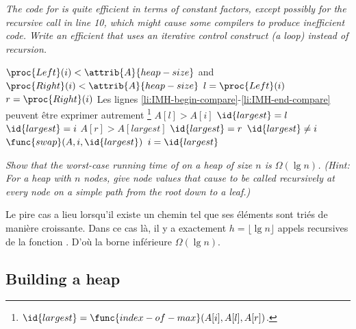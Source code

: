 \begin{description}
\begin{ex}
    \end{ex}
   \textit{The code for  is quite efficient in terms of constant factors, except
possibly for the recursive call in line 10, which might cause some compilers to
produce inefficient code. Write an efficient  that uses an iterative
control construct (a loop) instead of recursion.}
    \begin{ex}
      \begin{codebox}
        \li \While $\proc{Left}(i) < \attrib{A}{heap-size}$ and $\proc{Right}(i) < \attrib{A}{heap-size}$ \Do
        \li $l = \proc{Left}(i)$
        \li $r = \proc{Right}(i)$
        \li \Comment Les lignes \ref{li:IMH-begin-compare}-\ref{li:IMH-end-compare} peuvent \^etre exprimer autrement
      \footnote{$\id{largest} = \func{index-of-max}(A[i], A[l], A[r])$.}
        \li \If  $A[l] > A[i]$ \Do           \label{li:IMH-begin-compare} 
        \li $\id{largest} = l$        
        \li \Else $\id{largest} = i$ \End
        \li \If  $A[r] > A[largest]$ \Do
        \li $\id{largest} = r$  \End         \label{li:IMH-end-compare}
        \li \If $\id{largest} \ne i$ \Do
        \li $\func{swap}(A,i,\id{largest})$ 
        \li $i = \id{largest}$
        \li \Else \Return \End
        \End 
      \end{codebox}
    \end{ex}
   \textit{Show that the worst-case running time of  on a heap of size $n$
is $\Omega(\lg n)$. (Hint: For a heap with $n$ nodes, give node values that cause 
 to be called recursively at every node on a simple path from the root down to a leaf.)}
    \begin{ex}
      Le pire cas a lieu lorsqu'il existe un chemin tel que ses \'el\'ements sont tri\'es de mani\`ere croissante. Dans ce cas l\`a, il y a exactement $h = \lfloor \lg n\rfloor$ appels recursives de la fonction . D'o\`u la borne inf\'erieure $\Omega(\lg n)$.
    \end{ex} 
\end{description}

\subsection{Building a heap}

